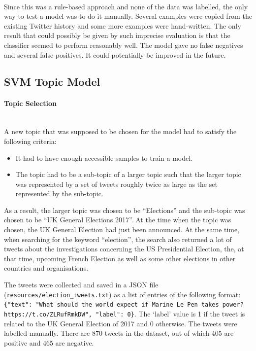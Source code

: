 \paragraph{}
Since this was a rule-based approach and none of the data was labelled, the only way to test a model was to do it manually. Several examples were copied from the existing Twitter history and some more examples were hand-written. The only result that could possibly be given by such imprecise evaluation is that the classifier seemed to perform reasonably well. The model gave no false negatives and several false positives. It could potentially be improved in the future.

\subsection{SVM Topic Model}

\paragraph{Topic Selection}\mbox{}\\
A new topic that was supposed to be chosen for the model had to satisfy the following criteria:
\begin{itemize}
    \item It had to have enough accessible samples to train a model.
    \item The topic had to be a sub-topic of a larger topic such that the larger topic was represented by a set of tweets roughly twice as large as the set represented by the sub-topic. 
\end{itemize}
As a result, the larger topic was chosen to be ``Elections'' and the sub-topic was chosen to be ``UK General Elections 2017''. At the time when the topic was chosen, the UK General Election had just been announced. At the same time, when searching for the keyword ``election'', the search also returned a lot of tweets about the investigations concerning the US Presidential Election, the, at that time, upcoming French Election as well as some other elections in other countries and organisations.

The tweets were collected and saved in a JSON file (\texttt{resources/election\_tweets.txt}) as a list of entries of the following format: \texttt{\{"text": "What should the world expect if Marine Le Pen takes power? https://t.co/ZLRufRmkDW", "label": 0\}}. The `label' value is 1 if the tweet is related to the UK General Election of 2017 and 0 otherwise. The tweets were labelled manually. There are 870 tweets in the dataset, out of which 405 are positive and 465 are negative.

